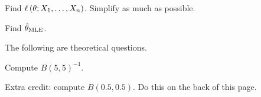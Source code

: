 \documentclass[12pt]{article}
\begin{document}
\benum

 Find $\ell\left(\theta ; X_1, \ldots, X_n\right)$. Simplify as much as possible.

 Find $\hat{\theta}_{\mathrm{MLE}}$. 

\eenum

\problem The following are theoretical questions.

\benum

 Compute $B(5,5)^{-1}$.

 Extra credit: compute $B(0.5,0.5)$. Do this on the back of this page. 

\eenum
\end{document}
